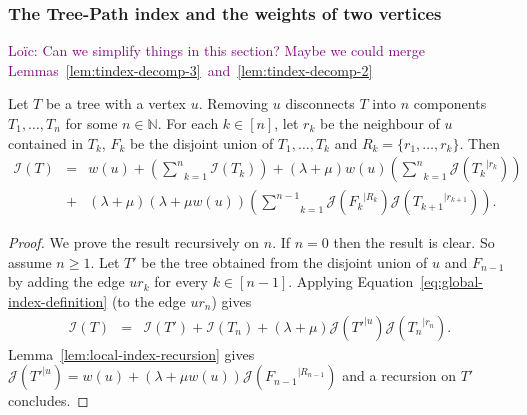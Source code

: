 \documentclass[11 pt]{modarticle}
\newcommand{\cN}{\mathbb{N}}
\newcommand{\wmap}{w}
\newcommand{\rtree}[2]{{#1}^{\lvert #2}}
\newcommand{\indexsymbol}{\mathcal{I}}
\newcommand{\tindex}[1]{\indexsymbol(#1)}
\newcommand{\rindexsymbol}{\mathcal{J}}
\newcommand{\rindex}[2]{\rindexsymbol(\rtree{#2}{#1})}
\newcommand{\ldcomment}[1]{\textcolor{purple}{{\footnotesize Loïc:} #1}}
\begin{document}
\subsubsection{The Tree-Path index and the weights of two vertices}

\ldcomment{Can we simplify things in this section? Maybe we could merge Lemmas~\ref{lem:tindex-decomp-3}~and~\ref{lem:tindex-decomp-2}}

\begin{lem}\label{lem:tindex-decomp-1}
Let $T$ be a tree with a vertex $u$. Removing $u$ disconnects $T$ into $n$ components $T_1,\dots, T_n$ for some $n\in \cN$. For each $k\in[n]$, let $r_k$ be the neighbour of $u$ contained in $T_k$, $F_k$ be the disjoint union of $T_1, \dots, T_k$ and $R_k = \{r_1, \dots, r_k\}$. Then
\begin{eqnarray*}
	\tindex{T} & = & \wmap(u) + \left(\underset{k=1}{\overset{n}{\sum}} \tindex{T_k}\right) + (\lambda + \mu)\wmap(u)\left(\underset{k=1}{\overset{n}{\sum}}\rindex{r_k}{T_k}\right) \\
	& + & (\lambda + \mu)(\lambda + \mu \wmap(u))\left(\underset{k=1}{\overset{n-1}{\sum}}\rindex{R_k}{F_k}\rindex{r_{k+1}}{T_{k+1}}\right).
\end{eqnarray*}
\end{lem}

\begin{proof}
We prove the result recursively on $n$. If $n = 0$ then the result is clear. %
So assume $n \geq 1$. Let $T'$ be the tree obtained from the disjoint union of $u$ and $F_{n-1}$ by adding the edge $u r_k$ for every $k \in [n-1]$. Applying Equation~\eqref{eq:global-index-definition} (to the edge $u r_n$) gives
\begin{eqnarray*}
	\tindex{T} & = & \tindex{T'} + \tindex{T_n} + (\lambda + \mu) \rindex{u}{T'} \rindex{r_n}{T_n}.
\end{eqnarray*}
Lemma~\ref{lem:local-index-recursion} gives $\rindex{u}{T'} = \wmap(u) + (\lambda + \mu \wmap(u)) \rindex{R_{n-1}}{F_{n-1}}$ and a recursion on $T'$ concludes.
\end{proof}
\end{document}
